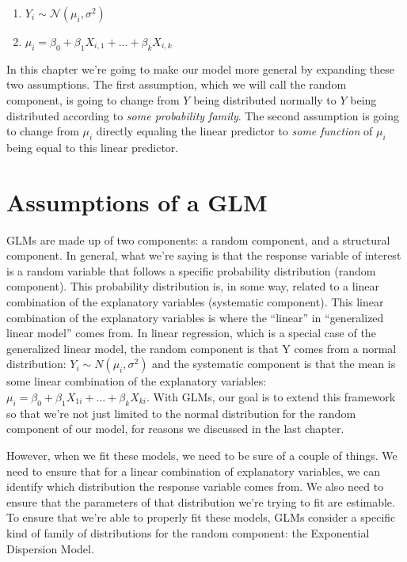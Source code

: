 \documentclass[
]{book}
\providecommand{\tightlist}{%
  \setlength{\itemsep}{0pt}\setlength{\parskip}{0pt}}
\begin{document}
\begin{enumerate}
\def\labelenumi{\arabic{enumi}.}
\tightlist
\item
  \(Y_i \sim \mathcal{N}(\mu_i,\sigma^2)\)
\item
  \(\mu_i = \beta_0 + \beta_{1}X_{i,1}+...+\beta_{k}X_{i,k}\)
\end{enumerate}

In this chapter we're going to make our model more general by expanding these two assumptions. The first assumption, which we will call the random component, is going to change from \(Y\) being distributed normally to \(Y\) being distributed according to \emph{some probability family}. The second assumption is going to change from \(\mu_i\) directly equaling the linear predictor to \emph{some function} of \(\mu_i\) being equal to this linear predictor.

\hypertarget{assumptions-of-a-glm}{%
\section{Assumptions of a GLM}\label{assumptions-of-a-glm}}

GLMs are made up of two components: a random component, and a structural component. In general, what we're saying is that the response variable of interest is a random variable that follows a specific probability distribution (random component). This probability distribution is, in some way, related to a linear combination of the explanatory variables (systematic component). This linear combination of the explanatory variables is where the ``linear'' in ``generalized linear model'' comes from. In linear regression, which is a special case of the generalized linear model, the random component is that Y comes from a normal distribution: \(Y_i\sim N(\mu_i,\sigma^2)\) and the systematic component is that the mean is some linear combination of the explanatory variables: \(\mu_i=\beta_0+\beta_1X_{1i}+...+\beta_kX_{ki}\). With GLMs, our goal is to extend this framework so that we're not just limited to the normal distribution for the random component of our model, for reasons we discussed in the last chapter.

However, when we fit these models, we need to be sure of a couple of things. We need to ensure that for a linear combination of explanatory variables, we can identify which distribution the response variable comes from. We also need to ensure that the parameters of that distribution we're trying to fit are estimable. To ensure that we're able to properly fit these models, GLMs consider a specific kind of family of distributions for the random component: the Exponential Dispersion Model.
\end{document}
